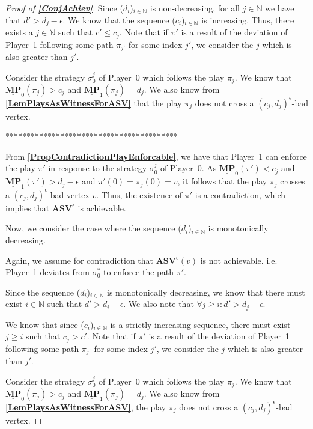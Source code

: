 \begin{proof}[Proof of \textbf{\cref{ConjAchiev}}]
Since ($d_i$)$_{i \in \mathbb{N}}$ is non-decreasing, for all $j \in \mathbb{N}$ we have that $d' > d_j - \epsilon$. We know that the sequence ($c_i$)$_{i \in \mathbb{N}}$ is increasing. Thus, there exists a $j \in \mathbb{N}$ such that $c' \leqslant c_j$. Note that if $\pi'$ is a result of the deviation of Player~1 following some path $\pi_{j'}$ for some index $j'$, we consider the $j$ which is also greater than $j'$.

Consider the strategy $\sigma_0^j$ of Player~0 which follows the play $\pi_j$. We know that $\underline{\mathbf{MP}}_0(\pi_j) > c_j$ and $\underline{\mathbf{MP}}_1(\pi_j) = d_j$. We also know from \textbf{\cref{LemPlaysAsWitnessForASV}} that the play $\pi_j$ does not cross a $(c_j, d_j)^{\epsilon}$-bad vertex. 

*****************************************

From \textbf{\cref{PropContradictionPlayEnforcable}}, we have that Player~1 can enforce the play $\pi'$ in response to the strategy $\sigma_0^j$ of Player~0. As $\underline{\mathbf{MP}}_0(\pi') < c_j$ and $ \underline{\mathbf{MP}}_1(\pi') > d_j-\epsilon$ and $\pi'(0) = \pi_j(0) = v$, it follows that the play $\pi_j$ crosses a $(c_j, d_j)^{\epsilon}$-bad vertex $v$. Thus, the existence of $\pi'$ is a contradiction, which implies that $\mathbf{ASV}^{\epsilon}$ is achievable.

Now, we consider the case where the sequence ($d_i$)$_{i \in \mathbb{N}}$ is monotonically decreasing.

Again, we assume for contradiction that $\mathbf{ASV}^{\epsilon}(v)$ is not achievable.  i.e. Player~1 deviates from $\sigma_0^*$ to enforce the path $\pi'$.

Since the sequence ($d_i$)$_{i \in \mathbb{N}}$ is monotonically decreasing, we know that there must exist $i \in \mathbb{N}$ such that $d' > d_i - \epsilon$. We also note that $\forall j \geqslant i: d' > d_j - \epsilon$.

We know that since ($c_i$)$_{i \in \mathbb{N}}$ is a strictly increasing sequence, there must exist $j \geqslant i$ such that $c_j > c'$. Note that if $\pi'$ is a result of the deviation of Player~1 following some path $\pi_{j'}$ for some index $j'$, we consider the $j$ which is also greater than $j'$.

Consider the strategy $\sigma_0^j$ of Player~0 which follows the play $\pi_j$. We know that $\underline{\mathbf{MP}}_0(\pi_j) > c_j$ and $ \underline{\mathbf{MP}}_1(\pi_j) = d_j$. We also know from \textbf{\cref{LemPlaysAsWitnessForASV}}, the play $\pi_j$ does not cross a $(c_j, d_j)^{\epsilon}$-bad vertex. 


\end{proof}
